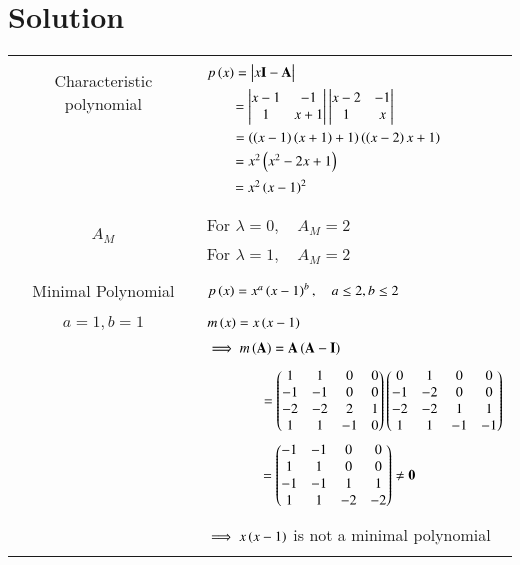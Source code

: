 \documentclass[journal,12pt]{IEEEtran}
\begin{document}
\section{\textbf{Solution}}
\renewcommand{\thetable}{2}
\begin{longtable}{|c|l|}
    \hline
	\multirow{3}{*}{Characteristic polynomial} 
	& \\
	& $p\brak{x}=\mydet{x\Vec{I}-\Vec{A}}$\\
	& $\qquad = \begin{vmatrix}x-1&-1\\1&x+1\end{vmatrix}\begin{vmatrix}x-2&-1\\1&x\end{vmatrix}$\\
	& $\qquad=\left(\left(x-1\right)\left(x+1\right)+1\right)\left(\left(x-2\right)x+1\right)$\\
	&$\qquad=x^2\left(x^2-2x+1\right)$\\
	&$\qquad=x^2\left(x-1\right)^2$\\
	&\\
	\hline
	\multirow{3}{*}{$A_M$} 
	&\\
	& For $\lambda=0,\quad A_M=2$\\
	& For $\lambda=1,\quad A_M=2$\\
	&\\
	\hline
	\multirow{3}{*}{Minimal Polynomial} & \\
	& $p\left(x\right)=x^a\left(x-1\right)^b,\quad a\leq2, b\leq2$\\
	&\\
	\hline
	\multirow{3}{*}{$a=1,b=1$} & \\
	&$m\left(x\right)=x\left(x-1\right)$\\
	&\\
	& $\implies m\brak{\vec{A}}=\vec{A}\brak{\Vec{A}-\vec{I}}$\\
	&\\
	& $\qquad\qquad=\begin{pmatrix}1&1&0&0\\-1&-1&0&0\\-2&-2&2&1\\1&1&-1&0\end{pmatrix}\begin{pmatrix}0&1&0&0\\-1&-2&0&0\\-2&-2&1&1\\1&1&-1&-1\end{pmatrix}$\\
	& $\qquad \qquad = \myvec{-1&-1&0&0\\1&1&0&0\\-1&-1&1&1\\1&1&-2&-2}\neq\Vec{0}$\\
	&\\
	& $\implies x\left(x-1\right)$ is not a minimal polynomial\\
	&\\
	\hline

\end{longtable}
\end{document}
